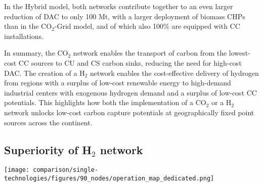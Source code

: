 \documentclass[twocolumn]{article}
\newcommand{\carbon}{CO$_2$}
\newcommand{\hydrogen}{H$_2$}
\newcommand{\modCO}{CO$_2$-Grid model}
\newcommand{\modHybrid}{Hybrid model}
\begin{document}
In the \modHybrid{}, both networks contribute together to an even larger reduction of DAC to only \label{}100 Mt, with a larger deployment of biomass CHPs than in the \modCO{}, and of which also 100\% are equipped with CC installations.

In summary, the \carbon{} network enables the transport of carbon from the lowest-cost CC sources to CU and CS carbon sinks, reducing the need for high-cost DAC.
The creation of a \hydrogen{} network enables the cost-effective delivery of hydrogen from regions with a surplus of low-cost renewable energy to high-demand industrial centers with exogenous hydrogen demand and a surplus of low-cost CC potentials.
This highlights how both the implementation of a \carbon{} or a \hydrogen{} network unlocks low-cost carbon capture potentials at geographically fixed point sources across the continent.


\subsection*{Superiority of \hydrogen{} network}


\begin{figure*}[ht!]
    \centering
    \texttt{[image: comparison/single-technologies/figures/90\_nodes/operation\_map\_dedicated.png]}
    \caption{Optimal operation per sector for a net-zero energy system in Europe with average production on the left and average consumption on the right for both, (a) the \carbon{} sector in the \carbon{}-Grid model and (b) the \hydrogen{} sector in the \hydrogen-Grid model.}
    \label{fig:operation_map}
\end{figure*}
\end{document}
